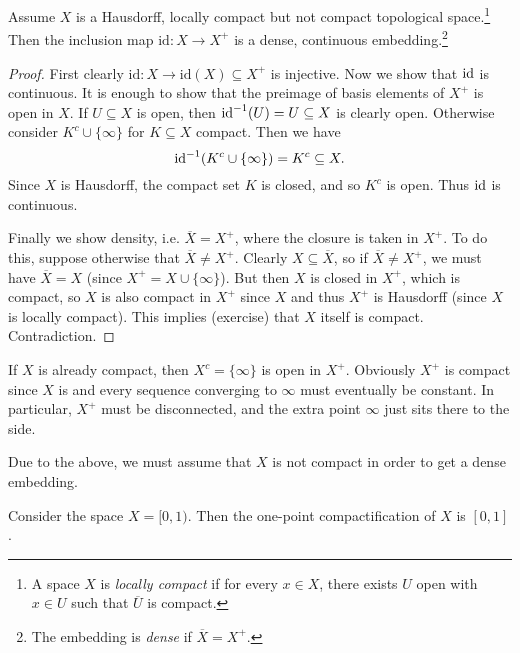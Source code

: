 \begin{theorem}
  Assume $X$ is a Hausdorff, locally compact but not
  compact
  topological space.\footnote{A space $X$ is \emph{locally compact} if for every $x \in X$, there exists $U$ open with $x \in U$ such that $\overline{U}$ is compact.} Then the inclusion map
  $\mathrm{id} : X \to X^+$ is a dense,
  continuous embedding.\footnote{The embedding is \emph{dense} if $\overline{X} = X^+$.}
\end{theorem}

\begin{proof}
  First clearly $\mathrm{id} : X \to \mathrm{id}(X) \subseteq X^+$ is
  injective. Now we show that $\operatorname{id}$ is continuous.
  It is enough to show that the preimage of basis
  elements of $X^+$ is open in $X$. If
  $U \subseteq X$ is open, then $\operatorname{id}^{-1}(U) = U \subseteq X$ is
  clearly open. Otherwise consider
  $K^c \cup \{\infty\}$ for $K \subseteq X$ compact.
  Then we have
  \[
    \operatorname{id}^{-1}(K^c \cup \{\infty\})
    = K^c \subseteq X.
  \]
  Since $X$ is Hausdorff, the compact set $K$ is
  closed, and so $K^c$ is open. Thus $\operatorname{id}$
  is continuous.

  Finally we show density, i.e. $\overline{X} = X^+$,
  where the closure is taken in $X^+$. To do this, suppose
  otherwise that $\overline{X} \ne X^+$. Clearly $X \subseteq \overline{X}$,
  so if $\overline{X} \ne X^+$, we must have
  $\overline{X} = X$ (since $X^+ = X \cup \{\infty\}$).
  But then $X$ is closed in $X^+$, which is
  compact, so $X$ is also compact in $X^+$ since
  $X$ and thus $X^+$ is Hausdorff (since
  $X$ is locally compact).
  This implies (exercise) that $X$ itself
  is compact.
  Contradiction.
\end{proof}

\begin{remark}
  If $X$ is already compact, then $X^c = \{\infty\}$
  is open in $X^+$. Obviously $X^+$ is compact since
  $X$ is and every sequence converging to $\infty$
  must eventually be constant. In particular,
  $X^+$ must be disconnected, and the extra point
  $\infty$ just sits there to the side.
\end{remark}

\begin{remark}
  Due to the above, we must assume that
  $X$ is not compact in order to get a dense embedding.
\end{remark}

\begin{example}
  Consider the space $X = [0, 1)$. Then the
  one-point compactification of $X$ is $[0, 1]$.
\end{example}
